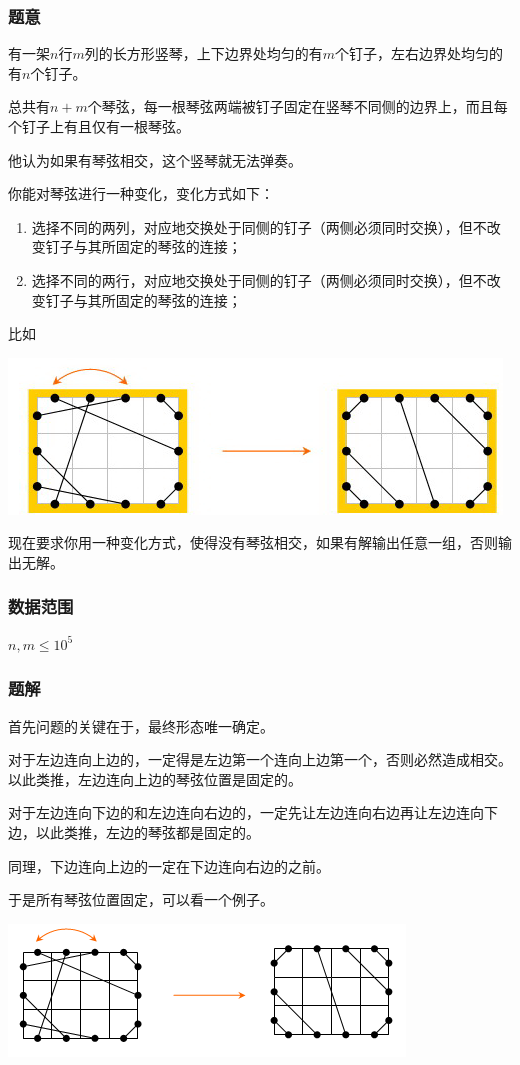 \documentclass{ctexart}
\begin{document}
\subsubsection{题意}
有一架$n$行$m$列的长方形竖琴，上下边界处均匀的有$m$个钉子，左右边界处均匀的有$n$个钉子。

总共有$n+m$个琴弦，每一根琴弦两端被钉子固定在竖琴不同侧的边界上，而且每个钉子上有且仅有一根琴弦。

他认为如果有琴弦相交，这个竖琴就无法弹奏。

你能对琴弦进行一种变化，变化方式如下：
\begin{enumerate}
\item 选择不同的两列，对应地交换处于同侧的钉子（两侧必须同时交换），但不改变钉子与其所固定的琴弦的连接；
\item 选择不同的两行，对应地交换处于同侧的钉子（两侧必须同时交换），但不改变钉子与其所固定的琴弦的连接；
\end{enumerate}

比如

\includegraphics{string.png}

现在要求你用一种变化方式，使得没有琴弦相交，如果有解输出任意一组，否则输出无解。
\subsubsection{数据范围}
$n,m \le 10^5$
\subsubsection{题解}
首先问题的关键在于，最终形态唯一确定。

对于左边连向上边的，一定得是左边第一个连向上边第一个，否则必然造成相交。以此类推，左边连向上边的琴弦位置是固定的。

对于左边连向下边的和左边连向右边的，一定先让左边连向右边再让左边连向下边，以此类推，左边的琴弦都是固定的。

同理，下边连向上边的一定在下边连向右边的之前。

于是所有琴弦位置固定，可以看一个例子。

\includegraphics{string_sample.png}
\end{document}
